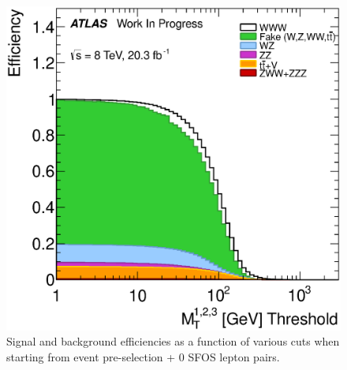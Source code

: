\begin{figure}[ht!]
\includegraphics[width=0.3\columnwidth]{figures/optimization/SignalRegionsPreselection_0SFOS_Efficiencies/ThreeLeptonMt_Cumulative.eps}
\caption{Signal and background efficiencies as a function of various cuts when starting from event pre-selection + 0 SFOS lepton pairs.}
\label{fig:optimization_efficiencies_0sfos}
\end{figure}


